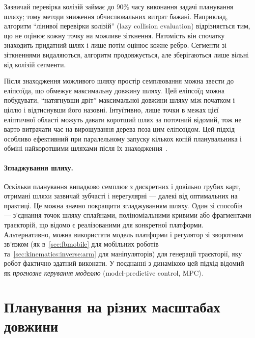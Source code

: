 Зазвичай перевірка колізій займає до $90\%$ часу виконання задачі планування шляху; тому методи зниження обчислювальних витрат бажані. Наприклад, алгоритм ``лінивої перевірки колізій'' (lazy collision evaluation) відрізняється тим, що не оцінює кожну точку на можливе зіткнення. Натомість він спочатку знаходить придатний шлях і лише потім оцінює кожне ребро. Сегменти зі зіткненнями видаляються, алгоритм продовжується, але зберігаються лише вільні від колізій сегменти.

Після знаходження можливого шляху простір семплювання можна звести до еліпсоїда, що обмежує максимальну довжину шляху. Цей еліпсоїд можна побудувати, ``натягнувши дріт'' максимальної довжини шляху між початком і ціллю і відтиснувши його назовні. Інтуїтивно, лише точки в межах цієї еліптичної області можуть давати коротший шлях за поточний відомий, тож не варто витрачати час на вирощування дерева поза цим еліпсоїдом. Цей підхід особливо ефективний при паралельному запуску кількох копій планувальника і обміні найкоротшими шляхами після їх знаходження~\cite{otte2012}.

\paragraph{Згладжування шляху.}
Оскільки планування випадково семплює з дискретних і довільно грубих карт, отримані шляхи зазвичай зубчасті і нерегулярні — далекі від оптимальних на практиці. Це можна значно покращити згладжуванням шляху. Один зі способів — з'єднання точок шляху сплайнами, поліноміальними кривими або фрагментами траєкторій, що відомо є реалізованими для конкретної платформи. Альтернативно, можна використати модель платформи і регулятор зі зворотним зв'язком (як в~\cref{sec:fbmobile} для мобільних роботів та~\cref{sec:kinematics:inverse:arm} для маніпуляторів) для генерації траєкторії, яку робот фактично здатний виконати.
У поєднанні з динамікою цей підхід відомий як \emph{прогнозне керування моделлю} (model-predictive control, MPC).

\section{Планування на різних масштабах довжини}

